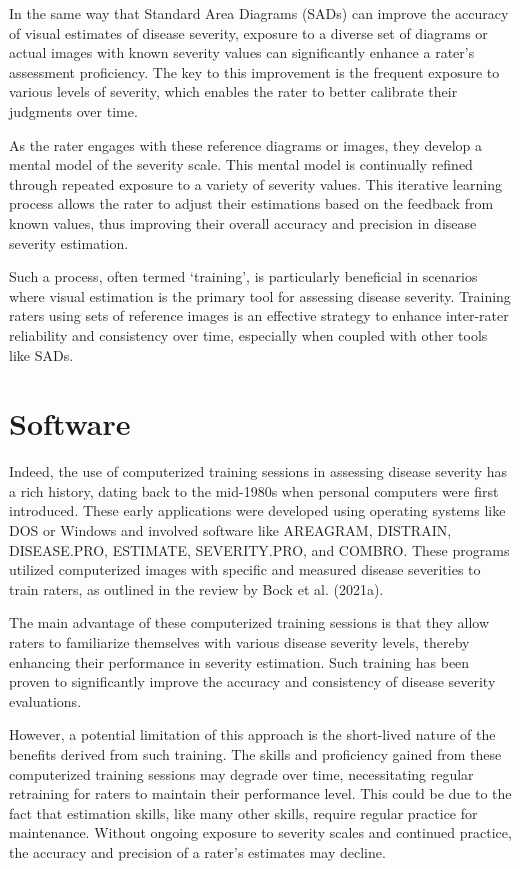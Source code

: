\documentclass[
  letterpaper,
]{book}
\begin{document}
In the same way that Standard Area Diagrams (SADs) can improve the
accuracy of visual estimates of disease severity, exposure to a diverse
set of diagrams or actual images with known severity values can
significantly enhance a rater's assessment proficiency. The key to this
improvement is the frequent exposure to various levels of severity,
which enables the rater to better calibrate their judgments over time.

As the rater engages with these reference diagrams or images, they
develop a mental model of the severity scale. This mental model is
continually refined through repeated exposure to a variety of severity
values. This iterative learning process allows the rater to adjust their
estimations based on the feedback from known values, thus improving
their overall accuracy and precision in disease severity estimation.

Such a process, often termed `training', is particularly beneficial in
scenarios where visual estimation is the primary tool for assessing
disease severity. Training raters using sets of reference images is an
effective strategy to enhance inter-rater reliability and consistency
over time, especially when coupled with other tools like SADs.

\hypertarget{software-1}{%
\section{Software}\label{software-1}}

Indeed, the use of computerized training sessions in assessing disease
severity has a rich history, dating back to the mid-1980s when personal
computers were first introduced. These early applications were developed
using operating systems like DOS or Windows and involved software like
AREAGRAM, DISTRAIN, DISEASE.PRO, ESTIMATE, SEVERITY.PRO, and COMBRO.
These programs utilized computerized images with specific and measured
disease severities to train raters, as outlined in the review by Bock et
al. (2021a).

The main advantage of these computerized training sessions is that they
allow raters to familiarize themselves with various disease severity
levels, thereby enhancing their performance in severity estimation. Such
training has been proven to significantly improve the accuracy and
consistency of disease severity evaluations.

However, a potential limitation of this approach is the short-lived
nature of the benefits derived from such training. The skills and
proficiency gained from these computerized training sessions may degrade
over time, necessitating regular retraining for raters to maintain their
performance level. This could be due to the fact that estimation skills,
like many other skills, require regular practice for maintenance.
Without ongoing exposure to severity scales and continued practice, the
accuracy and precision of a rater's estimates may decline.
\end{document}
